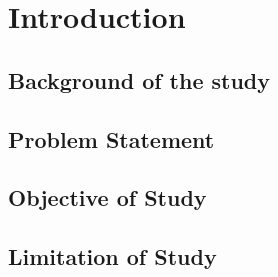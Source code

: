 \chapter{Introduction}
\label{c:intro}
\section{Background of the study}
\label{c:intro:background}



\section{Problem Statement}
\label{c:intro:thesisstatement}



\section{Objective of Study}
\label{c:intro:objective}


\section{Limitation of Study}
\label{c:intro:limitation}

